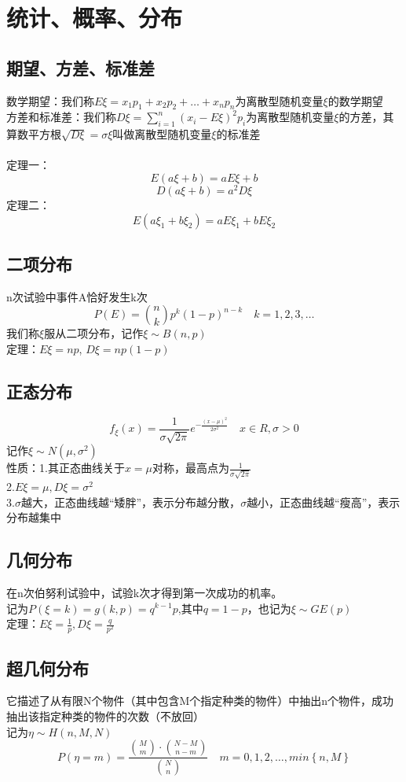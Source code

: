 \documentclass[UTF8]{ctexart}
\begin{document}
	\section{统计、概率、分布}
		\subsection{期望、方差、标准差}
			数学期望：我们称$E\xi = x_1 p_1+x_2 p_2+\dots+x_n p_n$为离散型随机变量$\xi$的数学期望\\
			\indent 方差和标准差：我们称$D\xi = \sum_{i=1}^{n}(x_i-E\xi)^2 p_i$为离散型随机变量$\xi$的方差，其算数平方根$\sqrt{D\xi}=\sigma\xi$叫做离散型随机变量$\xi$的标准差\\
			\\
			定理一：
			\[E(a\xi+b)=aE\xi+b\]
			\[D(a\xi+b)=a^2 D\xi\]
			定理二：
			\[E(a\xi _1+b\xi _2)=aE\xi _1+bE\xi _2\]
		\subsection{二项分布}
			n次试验中事件A恰好发生k次
			\[P(E) ={n \choose k}p^k (1-p)^{n-k}\quad k=1,2,3,\dots\]
			我们称$\xi$服从二项分布，记作$\xi \sim B(n,p)$\\
			定理：$E\xi = np$,	$D\xi = np(1-p)$
		\subsection{正态分布}
			\[f_\xi (x)=\frac{1}{\sigma\sqrt{2\pi}}e^{-\frac{(x-\mu)^2}{2\sigma ^2}} \quad x\in R,\sigma>0\]
			记作$\xi \sim N(\mu,\sigma ^2)$\\
			性质：1.其正态曲线关于$x=\mu$对称，最高点为$\frac{1}{\sigma\sqrt{2\pi}}$\\
			2.$E\xi=\mu,D\xi=\sigma ^2$\\
			3.$\sigma$越大，正态曲线越“矮胖”，表示分布越分散，$\sigma$越小，正态曲线越“瘦高”，表示分布越集中
		\subsection{几何分布}
			在n次伯努利试验中，试验k次才得到第一次成功的机率。\\
			记为$P(\xi=k)=g(k,p)=q^{k-1}p$,其中$q=1-p$，也记为$\xi \sim GE(p)$\\
			定理：$E\xi=\frac{1}{p},D\xi=\frac{q}{p^2}$
		\subsection{超几何分布}
			它描述了从有限N个物件（其中包含M个指定种类的物件）中抽出n个物件，成功抽出该指定种类的物件的次数（不放回）\\
			记为$\eta \sim H(n,M,N)$
			\[P\left ( \eta=m\right ) = \frac{\binom{M}{m}\cdot \binom{N-M}{n-m}}{\binom{N}{n}}\quad m=0,1,2,\dots,min \left\{ n,M \right\}\]
\end{document}
